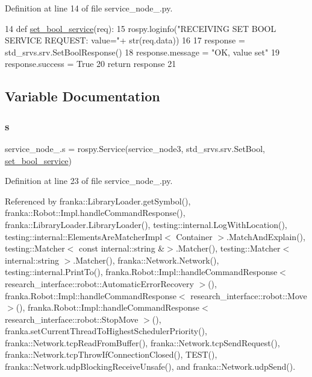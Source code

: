 Definition at line 14 of file service\+\_\+node\+\_.\+py.


\begin{DoxyCode}
14   \textcolor{keyword}{def }\hyperlink{namespaceservice__node__3_affc7430f48ff995e3010d20ea9921473}{set\_bool\_service}(req):
15       rospy.loginfo(\textcolor{stringliteral}{"RECEIVING SET BOOL SERVICE REQUEST: value="}+ str(req.data))
16 
17       response = std\_srvs.srv.SetBoolResponse()
18       response.message = \textcolor{stringliteral}{"OK, value set"}
19       response.success = \textcolor{keyword}{True}
20       \textcolor{keywordflow}{return} response
21 
\end{DoxyCode}


\subsection{Variable Documentation}
\mbox{\label{namespaceservice__node__3_aa976421a49e0b54f23833423400849ae}} 
\subsubsection{\texorpdfstring{s}{s}}
{\footnotesize\ttfamily service\+\_\+node\+\_.\+s = rospy.\+Service(\textquotesingle{}service\+\_\+node3\textquotesingle{}, std\+\_\+srvs.\+srv.\+Set\+Bool, \hyperlink{namespaceservice__node__3_affc7430f48ff995e3010d20ea9921473}{set\+\_\+bool\+\_\+service})}



Definition at line 23 of file service\+\_\+node\+\_.\+py.



Referenced by franka\+::\+Library\+Loader.\+get\+Symbol(), franka\+::\+Robot\+::\+Impl.\+handle\+Command\+Response(), franka\+::\+Library\+Loader.\+Library\+Loader(), testing\+::internal.\+Log\+With\+Location(), testing\+::internal\+::\+Elements\+Are\+Matcher\+Impl$<$ Container $>$.\+Match\+And\+Explain(), testing\+::\+Matcher$<$ const internal\+::string \&$>$.\+Matcher(), testing\+::\+Matcher$<$ internal\+::string $>$.\+Matcher(), franka\+::\+Network.\+Network(), testing\+::internal.\+Print\+To(), franka.\+Robot\+::\+Impl\+::handle\+Command\+Response$<$ research\+\_\+interface\+::robot\+::\+Automatic\+Error\+Recovery $>$(), franka.\+Robot\+::\+Impl\+::handle\+Command\+Response$<$ research\+\_\+interface\+::robot\+::\+Move $>$(), franka.\+Robot\+::\+Impl\+::handle\+Command\+Response$<$ research\+\_\+interface\+::robot\+::\+Stop\+Move $>$(), franka.\+set\+Current\+Thread\+To\+Highest\+Scheduler\+Priority(), franka\+::\+Network.\+tcp\+Read\+From\+Buffer(), franka\+::\+Network.\+tcp\+Send\+Request(), franka\+::\+Network.\+tcp\+Throw\+If\+Connection\+Closed(), T\+E\+S\+T(), franka\+::\+Network.\+udp\+Blocking\+Receive\+Unsafe(), and franka\+::\+Network.\+udp\+Send().

